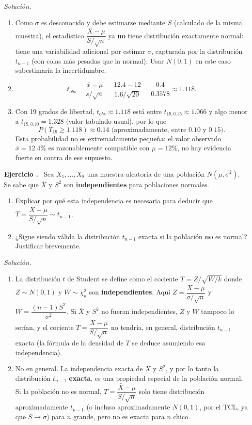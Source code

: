 \documentclass[11pt,a4paper]{article}
\newcounter{ejnum}
\newenvironment{ejercicio}{\refstepcounter{ejnum}\par\medskip\noindent\textbf{Ejercicio \theejnum.}~}{\par}
\newenvironment{solucion}{\par\noindent\textit{Solución.}~}{\par\vspace{1em}}
\begin{document}
\begin{solucion}
\begin{enumerate}[label=(\alph*)]
\item Como $\sigma$ es desconocido y debe estimarse mediante $S$ (calculado de la misma muestra), el estadístico $\dfrac{\bar X-\mu}{S/\sqrt n}$ ya \textbf{no} tiene distribución exactamente normal: tiene una variabilidad adicional por estimar $\sigma$, capturada por la distribución $t_{n-1}$ (con colas más pesadas que la normal). Usar $N(0,1)$ en este caso subestimaría la incertidumbre.
\item
$$t_{obs} = \frac{\bar x - \mu}{s/\sqrt n} = \frac{12.4-12}{1.6/\sqrt{20}} = \frac{0.4}{0.3578} \approx 1.118.$$
\item Con 19 grados de libertad, $t_{obs}\approx 1.118$ está entre $t_{19,0.15}\approx 1.066$ y algo menor a $t_{19,0.10}=1.328$ (valor tabulado usual), por lo que
$$P(T_{19}\geq 1.118) \approx 0.14 \text{ (aproximadamente, entre 0.10 y 0.15)}.$$
Esta probabilidad no es extremadamente pequeña: el valor observado $\bar x=12.4\%$ es razonablemente compatible con $\mu=12\%$, no hay evidencia fuerte en contra de ese supuesto.
\end{enumerate}
\end{solucion}

\begin{ejercicio}
Sea $X_1,\dots,X_8$ una muestra aleatoria de una población $N(\mu,\sigma^2)$. Se sabe que $\bar X$ y $S^2$ son \textbf{independientes} para poblaciones normales.
\begin{enumerate}[label=(\alph*)]
\item Explicar por qué esta independencia es necesaria para deducir que $T=\dfrac{\bar X-\mu}{S/\sqrt n}\sim t_{n-1}$.
\item ¿Sigue siendo válida la distribución $t_{n-1}$ exacta si la población \textbf{no} es normal? Justificar brevemente.
\end{enumerate}
\end{ejercicio}

\begin{solucion}
\begin{enumerate}[label=(\alph*)]
\item La distribución $t$ de Student se define como el cociente $T=Z/\sqrt{W/k}$ donde $Z\sim N(0,1)$ y $W\sim\chi^2_k$ son \textbf{independientes}. Aquí $Z=\dfrac{\bar X-\mu}{\sigma/\sqrt n}$ y $W=\dfrac{(n-1)S^2}{\sigma^2}$. Si $\bar X$ y $S^2$ no fueran independientes, $Z$ y $W$ tampoco lo serían, y el cociente $T=\dfrac{\bar X-\mu}{S/\sqrt n}$ no tendría, en general, distribución $t_{n-1}$ exacta (la fórmula de la densidad de $T$ se deduce asumiendo esa independencia).
\item No en general. La independencia exacta de $\bar X$ y $S^2$, y por lo tanto la distribución $t_{n-1}$ \textbf{exacta}, es una propiedad especial de la población normal. Si la población no es normal, $T=\dfrac{\bar X-\mu}{S/\sqrt n}$ solo tiene distribución aproximadamente $t_{n-1}$ (o incluso aproximadamente $N(0,1)$, por el TCL, ya que $S\to\sigma$) para $n$ grande, pero no es exacta para $n$ chico.
\end{enumerate}
\end{solucion}
\end{document}
